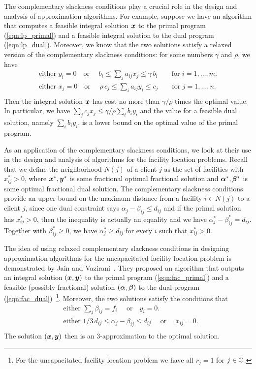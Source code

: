 \documentclass[oneside,final]{ucr}
\begin{document}
The complementary slackness conditions play a crucial role
in the design and analysis of approximation algorithms. For
example, suppose we have an algorithm that computes a
feasible integral solution $\boldsymbol{x}$ to the primal program
(\ref{eqn:lp_primal}) and a feasible integral solution to
the dual program (\ref{eqn:lp_dual}). Moreover, we know that
the two solutions satisfy a relaxed version of the
complementary slackness conditions: for some numbers
$\gamma$ and $\rho$, we have
\begin{align*}
  \text{either } y_i = 0  \quad \text{or } \quad b_i \leq \sum_{j}
  a_{ij} x_j \leq \gamma\, b_i \qquad \text{for } i = 1,
  \ldots, m.\\
  \text{either } x_j = 0  \quad \text{or } \quad \rho\, c_j \leq
  \sum_{i}a_{ij}y_i \leq c_j \qquad \text{for } j = 1,
  \ldots, n.\\
\end{align*}
Then the integral solution $\boldsymbol{x}$ has cost no more than
$\gamma/\rho$ times the optimal value. In particular, we
have $\sum_{j} c_j x_j \leq \gamma/\rho \sum_{i} b_i y_i$
and the value for a feasible dual solution, namely $\sum_{i}
b_i y_i$, is a lower bound on the optimal value of the
primal program.

As an application of the complementary slackness conditions,
we look at their use in the design and analysis of
algorithms for the facility location problems. Recall that
we define the neighborhood $N(j)$ of a client $j$ as the set
of facilities with $x_{ij}^\ast > 0$, where
$\boldsymbol{x}^\ast,\boldsymbol{y}^\ast$ is some fractional optimal fractional
solution and $\boldsymbol{\alpha}^\ast, \boldsymbol{\beta}^\ast$ is some optimal
fractional dual solution. The complementary slackness
conditions provide an upper bound on the maximum distance
from a facility $i \in N(j)$ to a client $j$, since one dual
constraint says $\alpha_j - \beta_{ij} \leq d_{ij}$ and if
the primal solution has $x_{ij}^\ast > 0$, then the
inequality is actually an equality and we have
$\alpha_j^\ast - \beta_{ij}^\ast = d_{ij}$. Together with
$\beta_{ij}^\ast \geq 0$, we have $\alpha_j^\ast \geq
d_{ij}$ for every $i$ such that $x_{ij}^\ast > 0$.

The idea of using relaxed complementary slackness conditions
in designing approximation algorithms for the uncapacitated
facility location problem is demonstrated by Jain and
Vazirani~\cite{JainV01}. They proposed an algorithm that
outputs an integral solution $(\boldsymbol{x}, \boldsymbol{y})$ to the primal
program (\ref{eqn:fac_primal}) and a feasible (possibly
fractional) solution $(\boldsymbol{\alpha},\boldsymbol{\beta})$ to the dual
program (\ref{eqn:fac_dual})~\footnote{For the uncapacitated
  facility location problem we have all $r_j = 1$ for
  $j\in\mathbb{C}$.}. Moreover, the two solutions satisfy the
conditions that
\begin{align*}
  &\text{either } \sum_{j} \beta_{ij} = f_i  \quad \text{ or
} \quad y_i = 0.\\
  &\text{either } 1/3\, d_{ij} \leq \alpha_j - \beta_{ij}
  \leq d_{ij} \quad \text{ or } \quad x_{ij} = 0.\\
\end{align*}
The solution $(\boldsymbol{x},\boldsymbol{y})$ then is an $3$-approximation to
the optimal solution.
\end{document}
